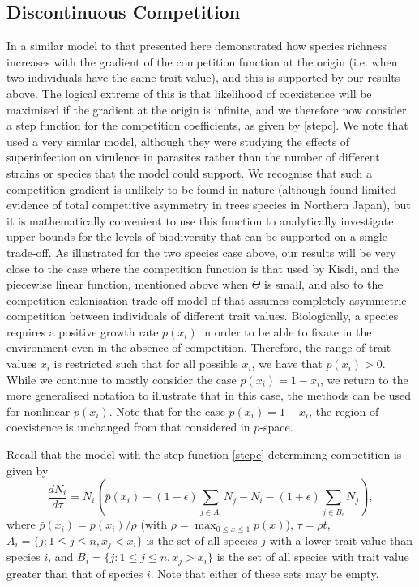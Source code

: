 \subsection{Discontinuous Competition}
In a similar model to that presented here \cite{adler2000space} demonstrated how species richness increases with the gradient of the competition function at the origin (i.e. when two individuals have the same trait value), and this is supported by our results above. The logical extreme of this is that likelihood of coexistence will be maximised if the gradient at the origin is infinite, and we therefore now consider a step function for the competition coefficients, as given by \eqref{stepc}. We note that \cite{nowak1994superinfection} used a very similar model, although they were studying the effects of superinfection on virulence in parasites rather than the number of different strains or species that the model could support. We recognise that such a competition gradient is unlikely to be found in nature (although \cite{kubota1995tree} found limited evidence of total competitive asymmetry in trees species in Northern Japan), but it is mathematically convenient to use this function to analytically investigate upper bounds for the  levels of biodiversity that can be supported on a single trade-off. As illustrated for the two species case above, our results will be very close to the case where the competition function is that used by Kisdi, and the piecewise linear function, mentioned above when $\Theta$ is small, and also to the competition-colonisation trade-off model of \cite{tilman1994competition} that assumes completely asymmetric competition between individuals of different trait values. Biologically, a species requires a positive growth rate $p(x_i)$ in order to be able to fixate in the environment even in the absence of competition. Therefore,  the range of trait values $x_i$ is restricted such that for all possible $x_i$, we have that $p(x_i)>0$. While we continue to mostly consider the case $p(x_i)=1-x_i$, we return to the more generalised notation to illustrate that in this case, the methods can be used for nonlinear $p(x_i)$. Note that for the case $p(x_i)=1-x_i$, the region of coexistence is unchanged from that considered in $p$-space.

Recall that the model with the step function \eqref{stepc} determining competition is given by
\begin{equation}
\label{rescaledmodel}
\frac{d N_i}{d\tau}=N_i\left(\bar{p}(x_i)-(1-\epsilon)\sum_{j\in A_i}N_j-N_i-(1+\epsilon)\sum_{j\in B_i}N_j\right),
\end{equation}
where $\bar{p}(x_i)=p(x_i)/\rho$ (with $\rho=\max_{0\leq x\leq 1} p(x)$), $\tau=\rho t$, $A_i=\{j:1\leq j\leq n,x_j<x_i\}$ is the set of all species $j$ with a lower trait value than species $i$, and $B_i=\{j:1\leq j\leq n,x_j>x_i\}$ is the set of all species with trait value greater than that of species $i$. Note that either of these sets may be empty. 

